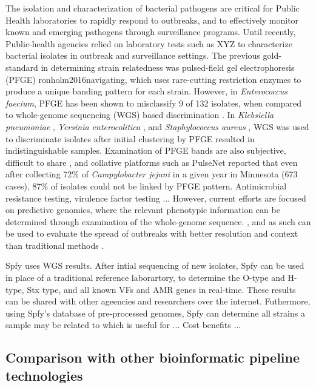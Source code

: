 \documentclass[a4,center,fleqn]{NAR}
\begin{document}
The isolation and characterization of bacterial pathogens are critical for Public Health laboratories to rapidly respond to outbreaks, and to effectively monitor known and emerging pathogens through surveillance programs.
Until recently, Public-health agencies relied on laboratory tests such as XYZ to characterize bacterial isolates in outbreak and surveillance settings.
The previous gold-standard in determining strain relatedness was pulsed-field gel electrophoresis (PFGE) {ronholm2016navigating}, which uses rare-cutting restriction enzymes to produce a unique banding pattern for each strain.
However, in \textit{Enterococcus faecium}, PFGE has been shown to misclassify 9 of 132 isolates, when compared to whole-genome sequencing (WGS) based discrimination \cite{pinholt2015multiple}.
In \textit{Klebsiella pneumoniae} \cite{marsh2015genomic}, \textit{Yersinia enterocolitica} \cite{gilpin2014limitations}, and \textit{Staphylococcus aureus} \cite{doi:10.1093/ofid/ofu096}, WGS was used to discriminate isolates after initial clustering by PFGE resulted in indistinguishable samples.
Examination of PFGE bands are also subjective, difficult to share \cite{lytsy2017time}, and collative platforms such as PulseNet reported \cite{gilpin2014limitations} that even after collecting 72\% of \textit{Campylobacter jejuni} in a given year in Minnesota (673 cases), 87\% of isolates could not be linked by PFGE pattern.
Antimicrobial resistance testing, virulence factor testing ...
However, current efforts are focused on predictive genomics, where the relevant phenotypic information can be determined through examination of the whole-genome sequence.
, and as such can be used to evaluate the spread of outbreaks with better resolution and context than traditional methods \cite{ronholm2016navigating}.

Spfy uses WGS results.
After intial sequencing of new isolates, Spfy can be used in place of a traditional reference laborartory, to determine the O-type and H-type, Stx type, and all known VFs and AMR genes in real-time.
These results can be shared with other ageencies and researchers over the internet.
Futhermore, using Spfy's database of pre-processed genomes, Spfy can determine all strains a sample may be related to which is useful for ...
Cost benefits ...

\subsection{Comparison with other bioinformatic pipeline technologies}
\end{document}
